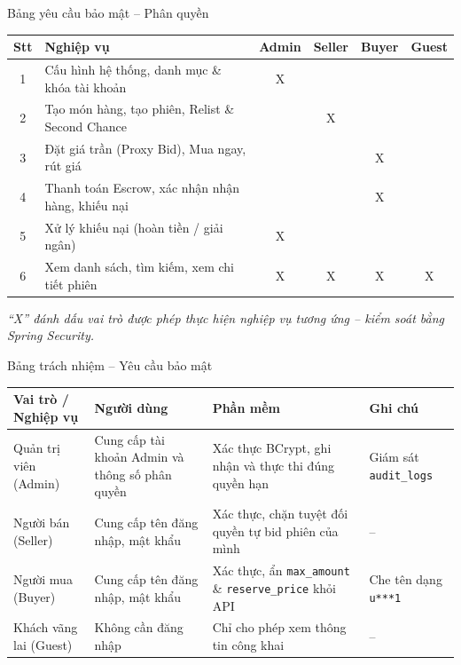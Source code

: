 \documentclass[aspectratio=169, 10pt]{beamer}
\begin{document}
\begin{frame}{Bảng yêu cầu bảo mật -- Phân quyền}
    \footnotesize
    \begin{table}[h]
        \centering
        \begin{tabular}{c l c c c c}
            \toprule
            \textbf{Stt} & \textbf{Nghiệp vụ} & \textbf{Admin} & \textbf{Seller} & \textbf{Buyer} & \textbf{Guest} \\
            \midrule
            1 & Cấu hình hệ thống, danh mục \& khóa tài khoản & X & & & \\
            \midrule
            2 & Tạo món hàng, tạo phiên, Relist \& Second Chance & & X & & \\
            \midrule
            3 & Đặt giá trần (Proxy Bid), Mua ngay, rút giá & & & X & \\
            \midrule
            4 & Thanh toán Escrow, xác nhận nhận hàng, khiếu nại & & & X & \\
            \midrule
            5 & Xử lý khiếu nại (hoàn tiền / giải ngân) & X & & & \\
            \midrule
            6 & Xem danh sách, tìm kiếm, xem chi tiết phiên & X & X & X & X \\
            \bottomrule
        \end{tabular}
    \end{table}
    \vspace{0.15cm}
    \centering \textit{\footnotesize ``X'' đánh dấu vai trò được phép thực hiện nghiệp vụ tương ứng -- kiểm soát bằng Spring Security.}
\end{frame}

\begin{frame}{Bảng trách nhiệm -- Yêu cầu bảo mật}
    \footnotesize
    \begin{table}[h]
        \centering
        \begin{tabular}{p{2.8cm} p{3.5cm} p{4.0cm} p{2.5cm}}
            \toprule
            \textbf{Vai trò / Nghiệp vụ} & \textbf{Người dùng} & \textbf{Phần mềm} & \textbf{Ghi chú} \\
            \midrule
            Quản trị viên (Admin) & Cung cấp tài khoản Admin và thông số phân quyền & Xác thực BCrypt, ghi nhận và thực thi đúng quyền hạn & Giám sát \texttt{audit\_logs} \\
            \midrule
            Người bán (Seller) & Cung cấp tên đăng nhập, mật khẩu & Xác thực, chặn tuyệt đối quyền tự bid phiên của mình & -- \\
            \midrule
            Người mua (Buyer) & Cung cấp tên đăng nhập, mật khẩu & Xác thực, ẩn \texttt{max\_amount} \& \texttt{reserve\_price} khỏi API & Che tên dạng \texttt{u***1} \\
            \midrule
            Khách vãng lai (Guest) & Không cần đăng nhập & Chỉ cho phép xem thông tin công khai & -- \\
            \bottomrule
        \end{tabular}
    \end{table}
\end{frame}
\end{document}
